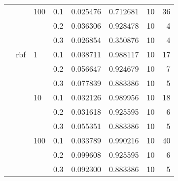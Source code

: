 \begin{table}[H]
\begin{tabular}{llllrrrr}
       &     & 100 & 0.1 &     0.025476 &  0.712681 &        10 &    36 \\
       &     &     & 0.2 &     0.036306 &  0.928478 &        10 &     4 \\
       &     &     & 0.3 &     0.026854 &  0.350876 &        10 &     4 \\
       & rbf & 1   & 0.1 &     0.038711 &  0.988117 &        10 &    17 \\
       &     &     & 0.2 &     0.056647 &  0.924679 &        10 &     7 \\
       &     &     & 0.3 &     0.077839 &  0.883386 &        10 &     5 \\
       &     & 10  & 0.1 &     0.032126 &  0.989956 &        10 &    18 \\
       &     &     & 0.2 &     0.031618 &  0.925595 &        10 &     6 \\
       &     &     & 0.3 &     0.055351 &  0.883386 &        10 &     5 \\
       &     & 100 & 0.1 &     0.033789 &  0.990216 &        10 &    40 \\
       &     &     & 0.2 &     0.099608 &  0.925595 &        10 &     6 \\
       &     &     & 0.3 &     0.092300 &  0.883386 &        10 &     5 \\
\bottomrule
\end{tabular}
\end{table}
